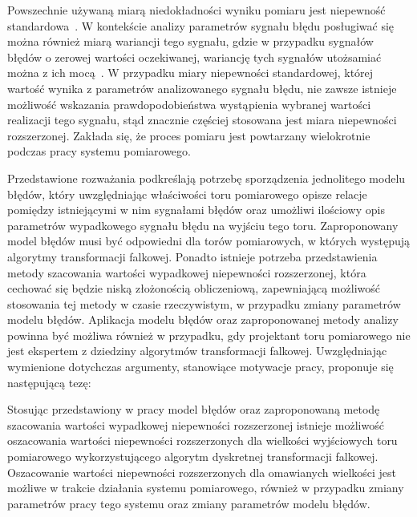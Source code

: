 Powszechnie używaną miarą niedokładności wyniku pomiaru jest niepewność standardowa~\cite{jcgm_guide}. W kontekście analizy parametrów sygnału błędu posługiwać się można również miarą wariancji tego sygnału, gdzie w przypadku sygnałów błędów o zerowej wartości oczekiwanej, wariancję tych sygnałów utożsamiać można z ich mocą~\cite{oppenheim_sns}. W przypadku miary niepewności standardowej, której wartość wynika z parametrów analizowanego sygnału błędu, nie zawsze istnieje możliwość wskazania prawdopodobieństwa wystąpienia wybranej wartości realizacji tego sygnału, stąd znacznie częściej stosowana jest miara niepewności rozszerzonej. Zakłada się, że proces pomiaru jest powtarzany wielokrotnie podczas pracy systemu pomiarowego.

Przedstawione rozważania podkreślają potrzebę sporządzenia jednolitego modelu błędów, który uwzględniając właściwości toru pomiarowego opisze relacje pomiędzy istniejącymi w nim sygnałami błędów oraz umożliwi ilościowy opis parametrów wypadkowego sygnału błędu na wyjściu tego toru. Zaproponowany model błędów musi być odpowiedni dla torów pomiarowych, w których występują algorytmy transformacji falkowej. Ponadto istnieje potrzeba przedstawienia metody szacowania wartości wypadkowej niepewności rozszerzonej, która cechować się będzie niską złożonością obliczeniową, zapewniającą możliwość stosowania tej metody w czasie rzeczywistym, w przypadku zmiany parametrów modelu błędów. Aplikacja modelu błędów oraz zaproponowanej metody analizy powinna być możliwa również w przypadku, gdy projektant toru pomiarowego nie jest ekspertem z dziedziny algorytmów transformacji falkowej. Uwzględniając wymienione dotychczas argumenty, stanowiące motywacje pracy, proponuje się następującą tezę:
\begin{quoting}[font = bfseries]
Stosując przedstawiony w pracy model błędów oraz zaproponowaną metodę szacowania wartości wypadkowej niepewności rozszerzonej istnieje możliwość oszacowania wartości niepewności rozszerzonych dla wielkości wyjściowych toru pomiarowego wykorzystującego algorytm dyskretnej transformacji falkowej. Oszacowanie wartości niepewności rozszerzonych dla omawianych wielkości jest możliwe w trakcie działania systemu pomiarowego, również w przypadku zmiany parametrów pracy tego systemu oraz zmiany parametrów modelu błędów.
\end{quoting}

